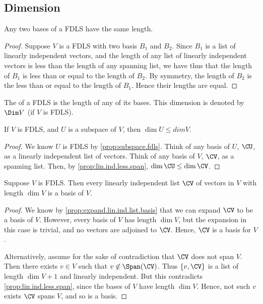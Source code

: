 \documentclass{article}
\begin{document}
\subsection{Dimension}
  \begin{prop}
    Any two bases of a FDLS have the same length.
  \end{prop}
  \begin{proof}
    Suppose $V$ is a FDLS with two basis $B_1$ and $B_2$. Since $B_1$ is a list of linearly independent vectors, and the length of any list of linearly independent vectors is
    less than the length of any spanning list, we have thus that the length of $B_1$ is less than or equal to the length of $B_2$. By symmetry, the length of $B_2$ is the less
    than or equal to the length of $B_1$. Hence their lengths are equal.
  \end{proof}
  \begin{defn}
    The  of a FDLS is the length of any of its bases. This dimension is denoted by $\Dim V$ (if $V$ is FDLS).
  \end{defn}
  \begin{prop}
    If $V$ is FDLS, and $U$ is a subspace of $V$, then $\dim U \leq dim V$.
  \end{prop}
  \begin{proof}
    We know $U$ is FDLS by \eqref{prop:subspace.fdls}. Think of any basis of $U$, $\CU$, as a linearly independent list of vectors. Think of any basis of $V$, $\CV$, as a
    spanning list. Then, by \eqref{prop:lin.ind.less.span}, $\dim \CU \leq \dim \CV$.
  \end{proof}
  \begin{prop}\label{prop:lin_ind_list_basis}
    Suppose $V$ is FDLS. Then every linearly independent list $\CV$ of vectors in $V$ with length $\dim V$ is a basis of $V$.
  \end{prop}
  \begin{proof}
    We know by \eqref{prop:expand.lin.ind.list.basis} that we can expand $\CV$ to be a basis of $V$. However, every basis of $V$ has length $\dim V$, but the expansion in this
    case is trivial, and no vectors are adjoined to $\CV$. Hence, $\CV$ is a basis for $V$.

    Alternatively, assume for the sake of contradiction that $\CV$ does not span $V$. Then there exists $v \in V$ such that $v \not\in \Span(\CV)$. Thus $\{v, \CV\}$ is a list
    of length $\dim V + 1$ and linearly independent. But this contradicts \eqref{prop:lin.ind.less.span}, since the bases of $V$ have length $\dim V$. Hence, not such $v$
    exists $\CV$ spans $V$, and so is a basis.
  \end{proof}
\end{document}
